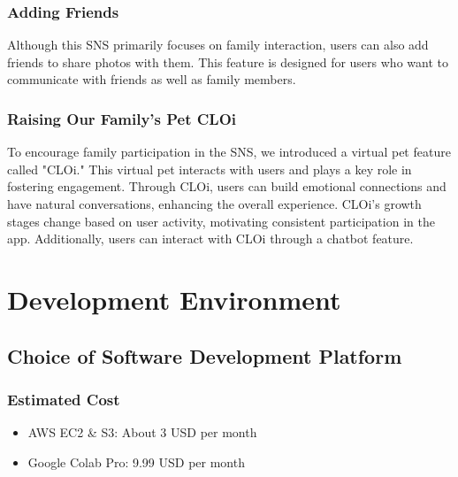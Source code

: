         \subsubsection{Adding Friends}
            Although this SNS primarily focuses on family interaction, users can also add friends to share photos with them. This feature is designed for users who want to communicate with friends as well as family members.

        \subsubsection{Raising Our Family's Pet CLOi}
            To encourage family participation in the SNS, we introduced a virtual pet feature called "CLOi." This virtual pet interacts with users and plays a key role in fostering engagement. Through CLOi, users can build emotional connections and have natural conversations, enhancing the overall experience. CLOi's growth stages change based on user activity, motivating consistent participation in the app. Additionally, users can interact with CLOi through a chatbot feature.

\section{Development Environment}
    \subsection{Choice of Software Development Platform}
        \subsubsection{Estimated Cost}
            \begin{itemize}
                \item AWS EC2 \& S3: About 3 USD per month
                \item Google Colab Pro: 9.99 USD per month
            \end{itemize}
        
